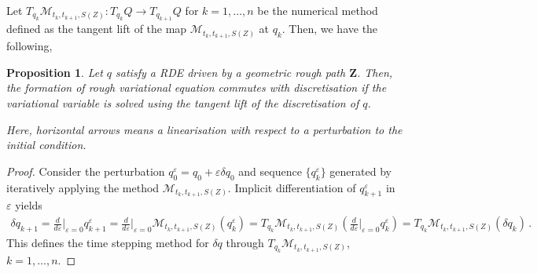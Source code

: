 \documentclass[11pt, oneside]{article}
\numberwithin{equation}{section}
\newtheorem{proposition}[lemma]{Proposition}
\theoremstyle{definition}
\newcommand{\mc}[1]{\mathcal{#1}}
\newcommand{\mcal}[1]{\mc{#1}}
\def\p{{\partial}}
\def\p{\partial}
\begin{document}
Let $T_{q_k}\mcal{M}_{t_k, t_{k+1}, S(Z)} : T_{q_k}Q \rightarrow T_{q_{k+1}}Q$ for $k=1,\ldots,n$ be the numerical method defined as the tangent lift of the map $\mcal{M}_{t_k, t_{k+1}, S(Z)}$ at $q_k$. Then, we have the following,
\begin{proposition}\label{prop:tangent general}
    Let $q$ satisfy a RDE driven by a geometric rough path $\mathbf{Z}$. Then, the formation of rough variational equation commutes with discretisation if the variational variable is solved using the tangent lift of the discretisation of $q$.
\begin{center}
\end{center}
Here, horizontal arrows means a linearisation with respect to a perturbation to the initial condition.
\end{proposition}
\begin{proof}
    Consider the perturbation $q^\varepsilon_0 = q_0 + \varepsilon \delta q_0$ and sequence $\{q^\varepsilon_k\}$ generated by iteratively applying the method $\mcal{M}_{t_k, t_{k+1}, S(Z)}$. Implicit differentiation of $q^\varepsilon_{k+1}$ in $\varepsilon$ yields 
    \begin{align*}
        \delta q_{k+1} = \frac{d}{d\varepsilon}\biggr|_{\varepsilon = 0} q^\varepsilon_{k+1} = \frac{d}{d\varepsilon}\biggr|_{\varepsilon = 0} \mcal{M}_{t_k, t_{k+1}, S(Z)}(q^\varepsilon_k) = T_{q_k}\mcal{M}_{t_k, t_{k+1}, S(Z)}\left(\frac{d}{d\varepsilon}\biggr|_{\varepsilon = 0}q^\varepsilon_k\right) = T_{q_k}\mcal{M}_{t_k, t_{k+1}, S(Z)}\left(\delta q_k\right)\,.
    \end{align*}
    This defines the time stepping method for $\delta q$ through $T_{q_k}\mcal{M}_{t_k, t_{k+1}, S(Z)}$, $k = 1,\ldots, n$.
\end{proof}
\end{document}
